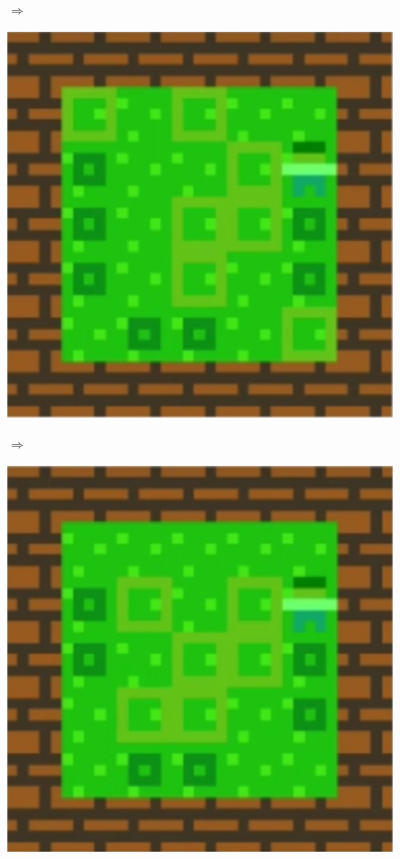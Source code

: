 \begin{figure}[!htbp]
\begin{minipage}[t]{0.25\textwidth}
\end{minipage}
$\Longrightarrow$
\begin{minipage}[t]{0.25\textwidth}
\includegraphics[width=\textwidth]{figures/part5i3_cropped.png} \hfill \\
\end{minipage}
$\Longrightarrow$
\begin{minipage}[t]{0.25\textwidth}
\includegraphics[width=\textwidth]{figures/part5i4_cropped.png} \hfill \\

\end{minipage}
\end{figure}
